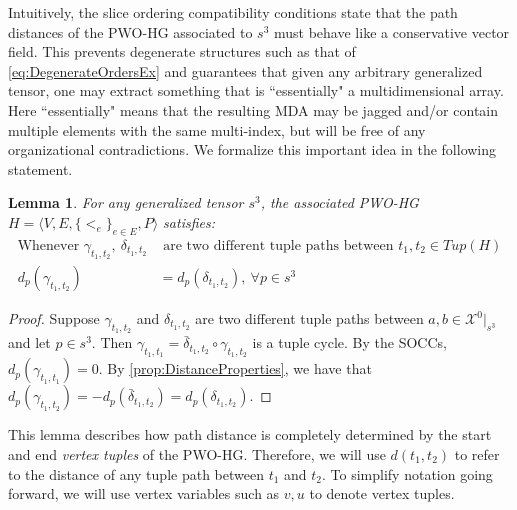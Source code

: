 \documentclass{article}
\theoremstyle{plain}
\newtheorem{lemma}[theorem]{Lemma}
\theoremstyle{definition}
\theoremstyle{remark}
\newcommand{\cX}{\mathcal{X}}
\begin{document}
Intuitively, the slice ordering compatibility conditions state that the path distances of the PWO-HG associated to $s^3$ must behave like a conservative vector field. This prevents degenerate structures such as that of \cref{eq:DegenerateOrdersEx} and guarantees that given any arbitrary generalized tensor, one may extract something that is ``essentially" a multidimensional array. Here ``essentially" means that the resulting MDA may be jagged and/or contain multiple elements with the same multi-index, but will be free of any organizational contradictions. We formalize this important idea in the following statement.
\begin{lemma}
	For any generalized tensor $s^3$, the associated PWO-HG $H = \big\langle V, E, \{<_e\}_{e \in E}, P \big\rangle$ satisfies:
	\begin{equation*}
		\begin{aligned}
			\text{Whenever } \gamma_{t_1,t_2}, \ \delta_{t_1,t_2} &\text{ are two different tuple paths between } t_1,t_2 \in Tup(H)\\
			d_p(\gamma_{t_1,t_2}) &= d_p(\delta_{t_1,t_2}), \ \forall p \in s^3
		\end{aligned}
	\end{equation*}
	\label{lem:TuplePathProp}
\end{lemma}
\begin{proof}
	Suppose $\gamma_{t_1,t_2}$ and $\delta_{t_1,t_2}$ are two different tuple paths between $a, b \in \cX^0|_{s^3}$ and let $p \in s^3$. Then $\gamma_{t_1,t_1} = \bar{\delta}_{t_1,t_2} \circ \gamma_{t_1,t_2}$ is a tuple cycle. By the SOCCs, $d_p(\gamma_{t_1,t_1}) = 0$. By \cref{prop:DistanceProperties}, we have that $d_p(\gamma_{t_1,t_2}) = -d_p(\bar{\delta}_{t_1,t_2}) = d_p(\delta_{t_1,t_2})$.
\end{proof}
This lemma describes how path distance is completely determined by the start and end \textit{vertex tuples} of the PWO-HG. Therefore, we will use $d(t_1, t_2)$ to refer to the distance of any tuple path between $t_1$ and $t_2$. To simplify notation going forward, we will use vertex variables such as $v, u$ to denote vertex tuples.
\end{document}
